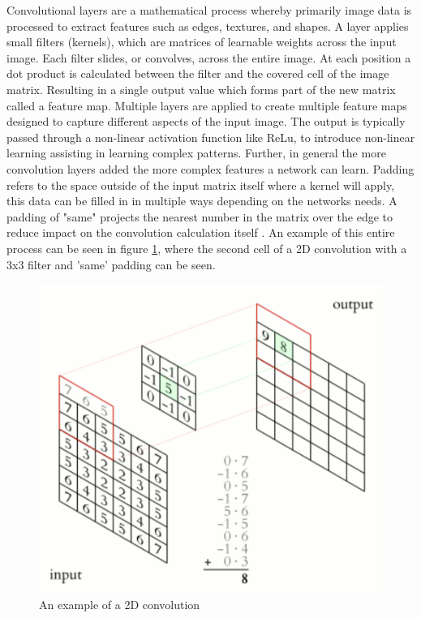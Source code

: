 \documentclass[10pt,twocolumn,letterpaper]{article}
\begin{document}
Convolutional layers are a mathematical process whereby primarily image data is processed to extract features such as edges, textures, and shapes. A layer applies small filters (kernels), which are matrices of learnable weights across the input image. Each filter slides, or convolves, across the entire image. At each position a dot product is calculated between the filter and the covered cell of the image matrix. Resulting in a single output value which forms part of the new matrix called a feature map. Multiple layers are applied to create multiple feature maps designed to capture different aspects of the input image. The output is typically passed through a non-linear activation function like ReLu, to introduce non-linear learning assisting in learning complex patterns. Further, in general the more convolution layers added the more complex features a network can learn. Padding refers to the space outside of the input matrix itself where a kernel will apply, this data can be filled in in multiple ways depending on the networks needs. A padding of "same" projects the nearest number in the matrix over the edge to reduce impact on the convolution calculation itself \cite{convolutiontheory}. An example of this entire process can be seen in figure \ref{fig:Convolution example}, where the second cell of a 2D convolution with a 3x3 filter and 'same' padding can be seen. 

\begin{figure} [h]
    \centering
    \includegraphics[width=\linewidth]{convolution.png}
    \caption{An example of a 2D convolution \cite{convolutiondiagram}}
    \label{fig:Convolution example}
\end{figure}
\end{document}
